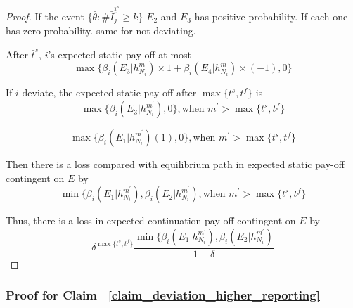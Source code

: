 \documentclass[12pt]{article}
\theoremstyle{remark}
\theoremstyle{remark}
\begin{document}
\begin{proof}
If the event $\{\bar{\theta}: \#\bar{I}^{\bar{t}^{s}}_j\geq k\}$ $E_2$ and $E_3$ has positive probability. If each one has zero probability. same for not deviating.  

After $\bar{t}^{s}$, $i$'s expected static pay-off at most 
\[
{\max\{\beta_{i}(E_3|h^{m}_{N_i})\times 1+\beta_{i}(E_4|h^{m}_{N_i})\times (-1), 0\}}
\]


If $i$ deviate, the expected static pay-off after $\max\{t^s,t^f\}$ is
 \[\max\{\beta_{i}(E_3|h^{m^{'}}_{N_i}),0\}, \text{when } m^{'}> \max\{t^s,t^f\}\]

\begin{equation}
\max\{\beta_{i}(E_1|h^{m^{'}}_{N_i})(1),0\}, \text{when } m^{'}> \max\{t^s,t^f\}
\end{equation}

Then there is a loss compared with equilibrium path in expected static pay-off contingent on $E$ by
\begin{equation}
\min\{\beta_{i}(E_1|h^{m^{'}}_{N_i}),\beta_{i}(E_2|h^{m^{'}}_{N_i}), \text{when } m^{'}> \max\{t^s,t^f\}
\end{equation}

Thus, there is a loss in expected continuation pay-off contingent on $E$ by
\[\delta^{\max\{t^s,t^f\}}\frac{\min\{\beta_{i}(E_1|h^{m^{'}}_{N_i}),\beta_{i}(E_2|h^{m^{'}}_{N_i})}{1-\delta}\]
\end{proof}





\subsubsection{Proof for Claim ~\ref{claim_deviation_higher_reporting}}
\end{document}
